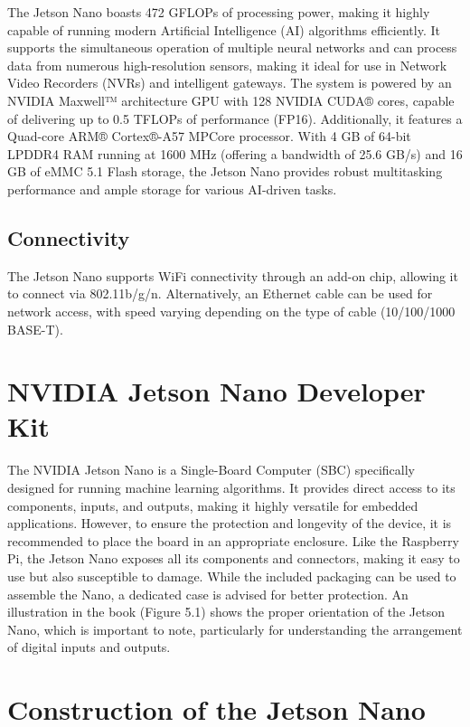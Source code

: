 The Jetson Nano boasts 472 GFLOPs of processing power, making it highly capable of running modern Artificial Intelligence (AI) algorithms efficiently. It supports the simultaneous operation of multiple neural networks and can process data from numerous high-resolution sensors, making it ideal for use in Network Video Recorders (NVRs) and intelligent gateways. The system is powered by an NVIDIA Maxwell™ architecture GPU with 128 NVIDIA CUDA® cores, capable of delivering up to 0.5 TFLOPs of performance (FP16). Additionally, it features a Quad-core ARM® Cortex®-A57 MPCore processor. With 4 GB of 64-bit LPDDR4 RAM running at 1600 MHz (offering a bandwidth of 25.6 GB/s) and 16 GB of eMMC 5.1 Flash storage, the Jetson Nano provides robust multitasking performance and ample storage for various AI-driven tasks.

\subsection{Connectivity}

The Jetson Nano supports WiFi connectivity through an add-on chip, allowing it to connect via 802.11b/g/n. Alternatively, an Ethernet cable can be used for network access, with speed varying depending on the type of cable (10/100/1000 BASE-T).


\section{NVIDIA Jetson Nano Developer Kit}

The NVIDIA Jetson Nano is a Single-Board Computer (SBC) specifically designed for running machine learning algorithms. It provides direct access to its components, inputs, and outputs, making it highly versatile for embedded applications. However, to ensure the protection and longevity of the device, it is recommended to place the board in an appropriate enclosure. Like the Raspberry Pi, the Jetson Nano exposes all its components and connectors, making it easy to use but also susceptible to damage. While the included packaging can be used to assemble the Nano, a dedicated case is advised for better protection. An illustration in the book (Figure 5.1) shows the proper orientation of the Jetson Nano, which is important to note, particularly for understanding the arrangement of digital inputs and outputs. \cite{NVI:2019}


\section{Construction of the Jetson Nano}


